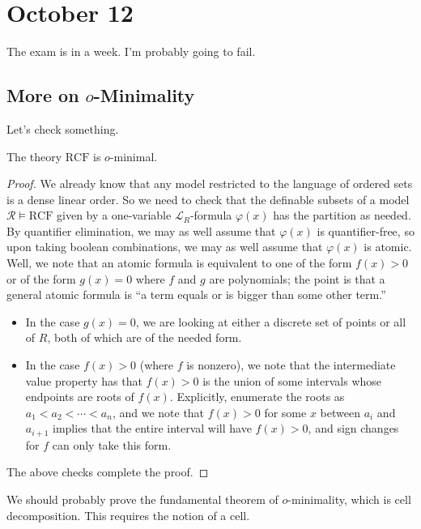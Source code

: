 \documentclass[../notes.tex]{subfiles}
\begin{document}
\section{October 12}

The exam is in a week. I'm probably going to fail.

\subsection{More on \texorpdfstring{$o$}{ o}-Minimality}
Let's check something.
\begin{theorem}
	The theory $\mathrm{RCF}$ is $o$-minimal.
\end{theorem}
\begin{proof}
	We already know that any model restricted to the language of ordered sets is a dense linear order. So we need to check that the definable subsets of a model $\mathcal R\models\mathrm{RCF}$ given by a one-variable $\mathcal L_R$-formula $\varphi(x)$ has the partition as needed. By quantifier elimination, we may as well assume that $\varphi(x)$ is quantifier-free, so upon taking boolean combinations, we may as well assume that $\varphi(x)$ is atomic. Well, we note that an atomic formula is equivalent to one of the form $f(x)>0$ or of the form $g(x)=0$ where $f$ and $g$ are polynomials; the point is that a general atomic formula is ``a term equals or is bigger than some other term.''
	\begin{itemize}
		\item In the case $g(x)=0$, we are looking at either a discrete set of points or all of $R$, both of which are of the needed form.
		\item In the case $f(x)>0$ (where $f$ is nonzero), we note that the intermediate value property has that $f(x)>0$ is the union of some intervals whose endpoints are roots of $f(x)$. Explicitly, enumerate the roots as $a_1<a_2<\cdots<a_n$, and we note that $f(x)>0$ for some $x$ between $a_i$ and $a_{i+1}$ implies that the entire interval will have $f(x)>0$, and sign changes for $f$ can only take this form.
	\end{itemize}
	The above checks complete the proof.
\end{proof}
We should probably prove the fundamental theorem of $o$-minimality, which is cell decomposition. This requires the notion of a cell.
\end{document}
